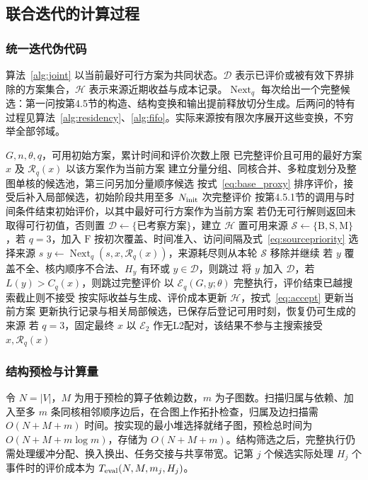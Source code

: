 \subsection{联合迭代的计算过程}
\label{subsec:joint_iteration}
\subsubsection{统一迭代伪代码}
算法~\ref{alg:joint} 以当前最好可行方案为共同状态。$\mathcal D$ 表示已评价或被有效下界排除的方案集合，$\mathcal H$ 表示来源近期收益与成本记录。$\operatorname{Next}_q$ 每次给出一个完整候选：第一问按第4.5节的构造、结构变换和输出提前释放切分生成。后两问的特有过程见算法~\ref{alg:residency}、\ref{alg:fifo}。实际来源按有限次序展开这些变换，不穷举全部邻域。
\begin{algorithm}[htbp]
\caption{统一完整方案的多邻域迭代（第一问取 $q=1$）}\label{alg:joint}
\small
\begin{algorithmic}[1]
\Require $G,n,\theta,q$，可用初始方案，累计时间和评价次数上限
\Ensure 已完整评价且可用的最好方案 $x$ 及 $\mathcal R_q(x)$
 \State 以该方案作为当前方案
\Else
 \State 建立分量分组、同核合并、多粒度划分及整图单核的候选池，第三问另加分量顺序候选
 \State 按式~\eqref{eq:base_proxy} 排序评价，接受后补入局部候选，初始阶段共用至多 $N_{\rm init}$ 次完整评价
 \State 按第4.5.1节的调用与时间条件结束初始评价，以其中最好可行方案作为当前方案
\EndIf
\State 若仍无可行解则返回未取得可行初值，否则置 $\mathcal D\gets\{\text{已考察方案}\}$，建立 $\mathcal H$
\State 置可用来源 $\mathcal S\gets\{\mathrm B,\mathrm S,\mathrm M\}$，若 $q=3$，加入 $\mathrm F$
 \State 按初次覆盖、时间准入、访问间隔及式~\eqref{eq:sourcepriority} 选择来源 $s$
 \State $y\gets\operatorname{Next}_q(s,x,\mathcal R_q(x))$，来源耗尽则从本轮 $\mathcal S$ 移除并继续
 \State 若 $y$ 覆盖不全、核内顺序不合法、$H_y$ 有环或 $y\in\mathcal D$，则跳过
 \State 将 $y$ 加入 $\mathcal D$，若 $L(y)>C_q(x)$，则跳过完整评价
 \State 以 $\mathcal E_q(G,y;\theta)$ 完整执行，评价结束已越搜索截止则不接受
 \State 按实际收益与生成、评价成本更新 $\mathcal H$，按式~\eqref{eq:accept} 更新当前方案
  \State 更新执行记录与相关局部候选，已保存后登记可用时刻，恢复仍可生成的来源
 \EndIf
\EndWhile
\State 若 $q=3$，固定最终 $x$ 以 $\mathcal E_2$ 作无L2配对，该结果不参与主搜索接受
\State \Return $x,\mathcal R_q(x)$
\end{algorithmic}
\end{algorithm}

\subsubsection{结构预检与计算量}
令 $N=|V|$，$M$ 为用于预检的算子依赖边数，$m$ 为子图数。扫描归属与依赖、加入至多 $m$ 条同核相邻顺序边后，在合图上作拓扑检查，归属及边扫描需 $O(N+M+m)$ 时间。按实现的最小堆选择就绪子图，预检总时间为 $O(N+M+m\log m)$，存储为 $O(N+M+m)$。结构筛选之后，完整执行仍需处理缓冲分配、换入换出、任务交接与共享带宽。记第 $j$ 个候选实际处理 $H_j$ 个事件时的评价成本为 $T_{\rm eval}(N,M,m_j,H_j)$。

